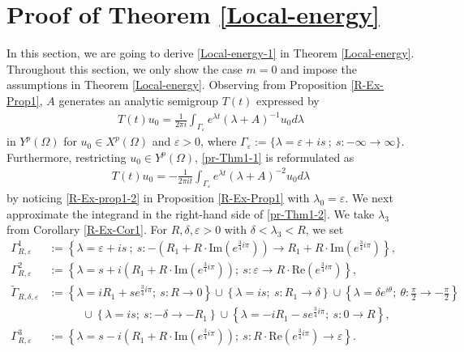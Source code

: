 \documentclass[dvipdfmx,12pt]{article}
\begin{document}
\vspace{-7mm}

\section{Proof of Theorem \ref{Local-energy}} 

\vspace{-2mm}
In this section, we are going to derive \eqref{Local-energy-1} in Theorem \ref{Local-energy}. Throughout this section, we only show the case $m=0$ and impose the assumptions in Theorem \ref{Local-energy}. Observing from Proposition \ref{R-Ex-Prop1}, $A$ generates an analytic semigroup $T(t)$ expressed by
\begin{gather}\label{pr-Thm1-1}
T(t)u_0=\frac{1}{2\pi i}\int_{\Gamma_\varepsilon} e^{\lambda t}(\lambda+A)^{-1}u_0 d\lambda
\end{gather}
in $Y^p(\Omega)$ for $u_0\in X^p(\Omega)$ and $\varepsilon>0$, where $\Gamma_\varepsilon:=\{\lambda=\varepsilon+i s~;~s:-\infty\to\infty\}$. Furthermore, restricting $u_0\in Y^p(\Omega)$, \eqref{pr-Thm1-1} is reformulated as 
\begin{gather}\label{pr-Thm1-2}
T(t)u_0=-\frac{1}{2\pi i t}\int_{\Gamma_\varepsilon} e^{\lambda t}(\lambda+A)^{-2}u_0 d\lambda
\end{gather}
by noticing \eqref{R-Ex-prop1-2} in Proposition \ref{R-Ex-Prop1} with $\lambda_0=\varepsilon$.
We next approximate the integrand in the right-hand side of \eqref{pr-Thm1-2}. We take $\lambda_3$ from Corollary \ref{R-Ex-Cor1}. For $R,\delta,\varepsilon>0$ with $\delta<\lambda_3<R$, we set
\begin{align*}
\Gamma_{R,\varepsilon}^1&:=\left\{\lambda=\varepsilon+i s~;~s:-\left(R_1+R\cdot\mathrm{Im}(e^{\frac{3}{4}i\pi})\right)\to R_1+R\cdot\mathrm{Im}(e^{\frac{3}{4}i\pi}) \right\}, \\
\Gamma_{R,\varepsilon}^2&:=\left\{ \lambda=s+i\left(R_1+R\cdot\mathrm{Im}(e^{\frac{3}{4}i\pi})\right);~s:\varepsilon\to R\cdot\mathrm{Re}\left(e^{\frac{3}{4}i\pi}\right) \right\}, \\
\widetilde{\Gamma}_{R,\delta,\varepsilon}&:=\left\{\lambda=iR_1+se^{\frac{3}{4}i\pi };~s: R\to 0\right\} \cup \left\{\lambda=is;~s:R_1 \to \delta\right\}  \cup \left\{\lambda=\delta e^{i\theta};~\theta: \frac{\pi}{2}\to -\frac{\pi}{2} \right\} \\
&\qquad\quad \cup \left\{\lambda=is;~s: -\delta \to -R_1 \right\}  \cup \left\{\lambda=-iR_1-se^{\frac{3}{4}i\pi };~s: 0\to R\right\}, \\
\Gamma_{R,\varepsilon}^3&:=\left\{ \lambda=s-i\left(R_1+R\cdot\mathrm{Im}(e^{\frac{3}{4}i\pi})\right);~s: R\cdot\mathrm{Re}\left(e^{\frac{3}{4}i\pi}\right)\to\varepsilon \right\}.
\end{align*}
\end{document}
